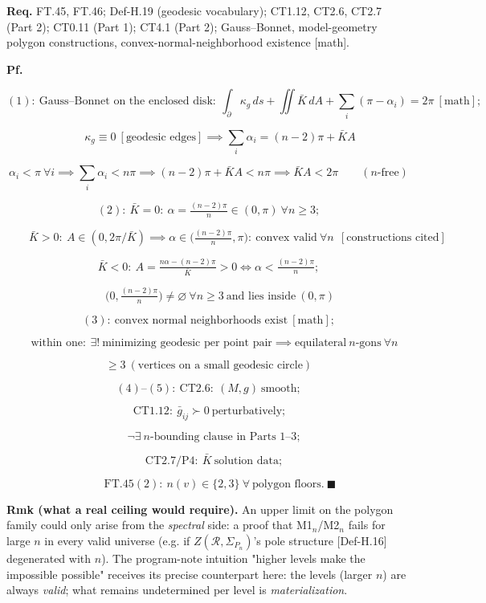 \begin{theorem}
\textbf{Req.} FT.45, FT.46; Def-H.19 (geodesic vocabulary); CT1.12, CT2.6, CT2.7 (Part 2); CT0.11 (Part 1); CT4.1 (Part 2); Gauss–Bonnet, model-geometry polygon constructions, convex-normal-neighborhood existence [math].

\textbf{Pf.}

\[
(1):\ \text{Gauss–Bonnet on the enclosed disk}:\ \int_{\partial}\kappa_g\,ds+\iint\bar K\,dA+\sum_i(\pi-\alpha_i)=2\pi\ [\text{math}];
\]

\[
\qquad \kappa_g\equiv0\ [\text{geodesic edges}]\implies\sum_i\alpha_i=(n-2)\pi+\bar KA
\]

\[
\alpha_i<\pi\ \forall i\implies\sum_i\alpha_i<n\pi\implies(n-2)\pi+\bar KA<n\pi\implies\bar KA<2\pi\qquad(n\text{-free})
\]

\[
(2):\ \bar K=0:\ \alpha=\tfrac{(n-2)\pi}{n}\in(0,\pi)\ \forall n\ge3;
\]

\[
\qquad \bar K>0:\ A\in(0,2\pi/\bar K)\implies\alpha\in\bigl(\tfrac{(n-2)\pi}{n},\pi\bigr):\ \text{convex valid}\ \forall n\ \ [\text{constructions cited}]
\]

\[
\bar K<0:\ A=\tfrac{n\alpha-(n-2)\pi}{\bar K}>0\iff\alpha<\tfrac{(n-2)\pi}{n};
\]

\[
\qquad \bigl(0,\tfrac{(n-2)\pi}{n}\bigr)\ne\varnothing\ \forall n\ge3\ \text{and lies inside}\ (0,\pi)
\]

\[
(3):\ \text{convex normal neighborhoods exist}\ [\text{math}];
\]

\[
\quad\text{within one}:\ \exists!\ \text{minimizing geodesic per point pair}\implies\text{equilateral}\ n\text{-gons}\ \forall n
\]

\[
\ge 3\ (\text{vertices on a small geodesic circle})
\]

\[
(4)\text{--}(5):\ \mathrm{CT2.6}:\ (M,g)\ \text{smooth};
\]

\[
\ \mathrm{CT1.12}:\ \bar g_{ij}\succ0\ \text{perturbatively};
\]

\[
\quad\neg\exists\ n\text{-bounding clause in Parts 1–3};
\]

\[
\quad\mathrm{CT2.7}/\mathrm{P4}:\ \bar K\ \text{solution data};
\]

\[
\qquad \mathrm{FT.45}(2):\ n(v)\in\{2,3\}\ \forall\ \text{polygon floors}.\ \blacksquare
\]

\textbf{Rmk (what a real ceiling would require).} An upper limit on the polygon family could only arise from the \textit{spectral} side: a proof that M1$_n$/M2$_n$ fails for large $n$ in every valid universe (e.g. if $Z(\mathcal R,\Sigma_{P_n})$'s pole structure [Def-H.16] degenerated with $n$). The program-note intuition "higher levels make the impossible possible" receives its precise counterpart here: the levels (larger $n$) are always \textit{valid}; what remains undetermined per level is \textit{materialization}.


\end{theorem}
